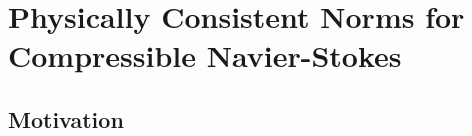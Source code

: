 \documentclass[Dissertation.tex]{subfiles}
\begin{document}
\chapter{Physically Consistent Norms for Compressible Navier-Stokes}
\label{sec:EntropyNorm}
\section{Motivation}
\end{document}
